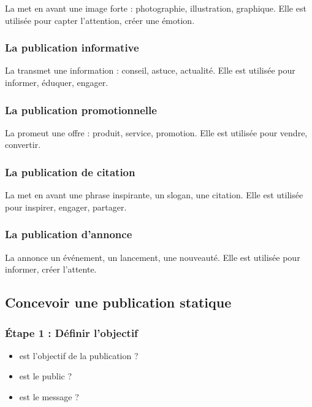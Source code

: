 La  met en avant une image forte : photographie, illustration, graphique. Elle est utilisée pour capter l'attention, créer une émotion.

\subsubsection{La publication informative}

La  transmet une information : conseil, astuce, actualité. Elle est utilisée pour informer, éduquer, engager.

\subsubsection{La publication promotionnelle}

La  promeut une offre : produit, service, promotion. Elle est utilisée pour vendre, convertir.

\subsubsection{La publication de citation}

La  met en avant une phrase inspirante, un slogan, une citation. Elle est utilisée pour inspirer, engager, partager.

\subsubsection{La publication d'annonce}

La  annonce un événement, un lancement, une nouveauté. Elle est utilisée pour informer, créer l'attente.

\subsection{Concevoir une publication statique}

\subsubsection{Étape 1 : Définir l'objectif}

\begin{itemize}
    \item {} est l'objectif de la publication ?
    \item {} est le public ?
    \item {} est le message ?
\end{itemize}

